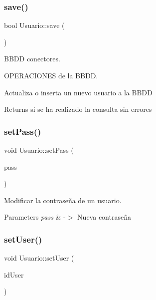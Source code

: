 \subsubsection{\texorpdfstring{save()}{save()}}
{\footnotesize\ttfamily bool Usuario\+::save (\begin{DoxyParamCaption}{ }\end{DoxyParamCaption})}



B\+B\+DD conectores. 

O\+P\+E\+R\+A\+C\+I\+O\+N\+ES de la B\+B\+DD.

Actualiza o inserta un nuevo usuario a la B\+B\+DD \begin{DoxyReturn}{Returns}
si se ha realizado la consulta sin errores 
\end{DoxyReturn}
\mbox{\label{classUsuario_aa13faa50f1b4226f0c0d400911fa7c34}} 
\subsubsection{\texorpdfstring{set\+Pass()}{setPass()}}
{\footnotesize\ttfamily void Usuario\+::set\+Pass (\begin{DoxyParamCaption}\item[{Q\+String}]{pass }\end{DoxyParamCaption})}



Modificar la contraseña de un usuario. 


\begin{DoxyParams}{Parameters}
{\em pass} & -\/$>$ Nueva contraseña \\
\hline
\end{DoxyParams}
\mbox{\label{classUsuario_a7418cbad332fa68f0803f2449f304251}} 
\subsubsection{\texorpdfstring{set\+User()}{setUser()}}
{\footnotesize\ttfamily void Usuario\+::set\+User (\begin{DoxyParamCaption}\item[{Q\+String}]{id\+User }\end{DoxyParamCaption})}



